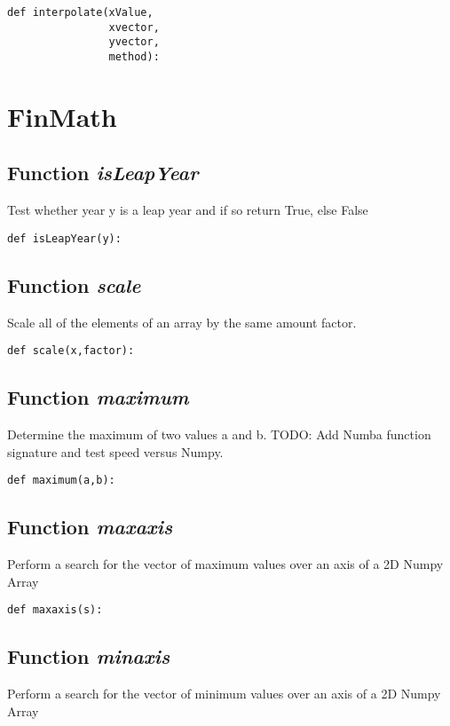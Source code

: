 \documentclass[twoside,11pt]{book}
\begin{document}
\begin{lstlisting}
def interpolate(xValue,
                xvector,
                yvector,
                method):
\end{lstlisting}

\newpage
\section{FinMath}

\subsection{Function {\it isLeapYear}}
Test whether year y is a leap year and if so return True, else False 

\begin{lstlisting}
def isLeapYear(y):
\end{lstlisting}

\subsection{Function {\it scale}}
Scale all of the elements of an array by the same amount factor. 

\begin{lstlisting}
def scale(x,factor):
\end{lstlisting}

\subsection{Function {\it maximum}}
Determine the maximum of two values a and b. TODO: Add Numba function signature and test speed versus Numpy. 

\begin{lstlisting}
def maximum(a,b):
\end{lstlisting}

\subsection{Function {\it maxaxis}}
Perform a search for the vector of maximum values over an axis of a 2D Numpy Array 

\begin{lstlisting}
def maxaxis(s):
\end{lstlisting}

\subsection{Function {\it minaxis}}
Perform a search for the vector of minimum values over an axis of a 2D Numpy Array 
\end{document}
